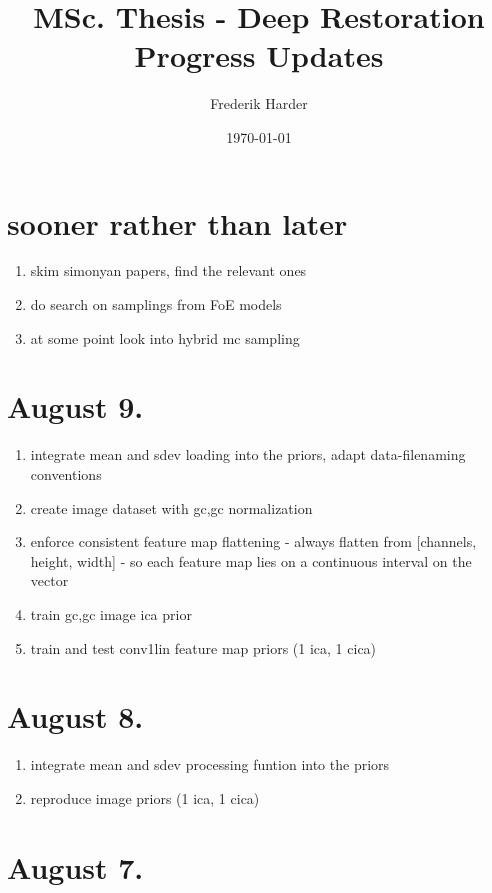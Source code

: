 \documentclass{article}
\title{MSc. Thesis - Deep Restoration\\Progress Updates}
\date{\today}
\author{Frederik Harder}
\begin{document}
\maketitle

\section*{sooner rather than later}

\begin{enumerate}
	\item skim simonyan papers, find the relevant ones
	\item do search on samplings from FoE models
	\item at some point look into hybrid mc sampling
\end{enumerate}

\section{August 9.}

\begin{enumerate}
	\item integrate mean and sdev loading into the priors, adapt data-filenaming conventions
	\item create image dataset with gc,gc normalization
	\item enforce consistent feature map flattening - always flatten from [channels, height, width] - so each feature map lies on a continuous interval on the vector
	\item train gc,gc image ica prior
	\item train and test conv1lin feature map priors (1 ica, 1 cica)
\end{enumerate}

\section{August 8.}

\begin{enumerate}
	\item integrate mean and sdev processing funtion into the priors
	\item reproduce image priors (1 ica, 1 cica)
\end{enumerate}


\section*{August 7.}
\end{document}
